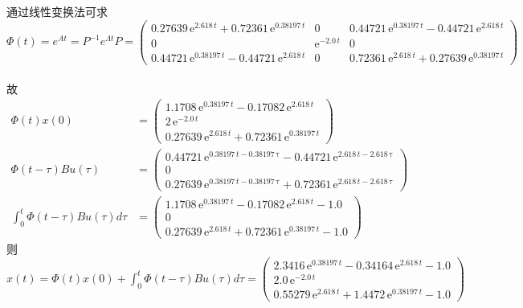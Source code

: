\documentclass[a4paper]{article}
\begin{document}
通过线性变换法可求 \\
$$ \Phi(t)=
e^{At}=P^{-1}e^{{\Lambda}t}P= \left(\begin{array}{ccc} 0.27639\, \mathrm{e}^{2.618\, t} + 0.72361\, \mathrm{e}^{0.38197\, t} & 0 & 0.44721\, \mathrm{e}^{0.38197\, t} - 0.44721\, \mathrm{e}^{2.618\, t}\\ 0 & \mathrm{e}^{- 2.0\, t} & 0\\ 0.44721\, \mathrm{e}^{0.38197\, t} - 0.44721\, \mathrm{e}^{2.618\, t} & 0 & 0.72361\, \mathrm{e}^{2.618\, t} + 0.27639\, \mathrm{e}^{0.38197\, t} \end{array}\right) $$ \\
\mbox{故 }
\begin{align*}
\Phi(t)x(0) &= \left(\begin{array}{c} 1.1708\, \mathrm{e}^{0.38197\, t} - 0.17082\, \mathrm{e}^{2.618\, t}\\ 2\, \mathrm{e}^{- 2.0\, t}\\ 0.27639\, \mathrm{e}^{2.618\, t} + 0.72361\, \mathrm{e}^{0.38197\, t} \end{array}\right) \\
\Phi(t-\tau)Bu(\tau) &= \left(\begin{array}{c} 0.44721\, \mathrm{e}^{0.38197\, t - 0.38197\, \mathrm{\tau}} - 0.44721\, \mathrm{e}^{2.618\, t - 2.618\, \mathrm{\tau}}\\ 0\\ 0.27639\, \mathrm{e}^{0.38197\, t - 0.38197\, \mathrm{\tau}} + 0.72361\, \mathrm{e}^{2.618\, t - 2.618\, \mathrm{\tau}} \end{array}\right)  \\ 
\int_0^t{\Phi(t-\tau)Bu(\tau)d\tau} &= \left(\begin{array}{c} 1.1708\, \mathrm{e}^{0.38197\, t} - 0.17082\, \mathrm{e}^{2.618\, t} - 1.0\\ 0\\ 0.27639\, \mathrm{e}^{2.618\, t} + 0.72361\, \mathrm{e}^{0.38197\, t} - 1.0 \end{array}\right)
\end{align*}
\mbox{则 }$x(t)=\Phi(t)x(0)+\int_0^t{\Phi(t-\tau)Bu(\tau)d\tau}=\left(\begin{array}{c} 2.3416\, \mathrm{e}^{0.38197\, t} - 0.34164\, \mathrm{e}^{2.618\, t} - 1.0\\ 2.0\, \mathrm{e}^{- 2.0\, t}\\ 0.55279\, \mathrm{e}^{2.618\, t} + 1.4472\, \mathrm{e}^{0.38197\, t} - 1.0 \end{array}\right) $ \\
\end{document}
